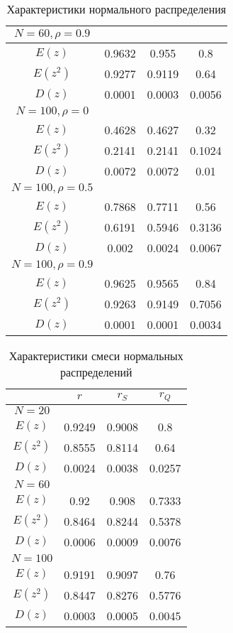 \documentclass[12pt,a4paper]{article}
\begin{document}
\begin{table}[H]
\begin{tabular}{|c|c|c|c|}
        \hline
        $N = 60, \rho = 0.9$ & & &\\\hline
        $E(z)$ & 0.9632 & 0.955 & 0.8\\\hline
        $E(z^2)$ & 0.9277 & 0.9119 & 0.64\\\hline
        $D(z)$ & 0.0001 & 0.0003 & 0.0056\\\hline
        \hline
        $N = 100, \rho = 0$ & & &\\\hline
        $E(z)$ & 0.4628 & 0.4627 & 0.32\\\hline
        $E(z^2)$ & 0.2141 & 0.2141 & 0.1024\\\hline
        $D(z)$ & 0.0072 & 0.0072 & 0.01\\\hline
        \hline
        $N = 100, \rho = 0.5$ & & &\\\hline
        $E(z)$ & 0.7868 & 0.7711 & 0.56\\\hline
        $E(z^2)$ & 0.6191 & 0.5946 & 0.3136\\\hline
        $D(z)$ & 0.002 & 0.0024 & 0.0067\\\hline
        \hline
        $N = 100, \rho = 0.9$ & & &\\\hline
        $E(z)$ & 0.9625 & 0.9565 & 0.84\\\hline
        $E(z^2)$ & 0.9263 & 0.9149 & 0.7056\\\hline
        $D(z)$ & 0.0001 & 0.0001 & 0.0034\\\hline
    \end{tabular}
    \caption{Характеристики нормального распределения}
\end{table}

\begin{table}[H]
    \centering
    \begin{tabular}{|c|c|c|c|}
        \hline
        & $r$ & $r_S$ & $r_Q$\\\hline
        $N = 20$ & & &\\\hline
        $E(z)$ & 0.9249 & 0.9008 & 0.8\\\hline
        $E(z^2)$ & 0.8555 & 0.8114 & 0.64\\\hline
        $D(z)$ & 0.0024 & 0.0038 & 0.0257\\\hline
        \hline
        $N = 60$ & & &\\\hline
        $E(z)$ & 0.92 & 0.908 & 0.7333\\\hline
        $E(z^2)$ & 0.8464 & 0.8244 & 0.5378\\\hline
        $D(z)$ & 0.0006 & 0.0009 & 0.0076\\\hline
        \hline
        $N = 100$ & & &\\\hline
        $E(z)$ & 0.9191 & 0.9097 & 0.76\\\hline
        $E(z^2)$ & 0.8447 & 0.8276 & 0.5776\\\hline
        $D(z)$ & 0.0003 & 0.0005 & 0.0045\\\hline
    \end{tabular}
    \caption{Характеристики смеси нормальных распределений}
\end{table}
\end{document}
